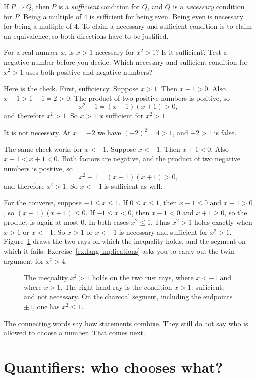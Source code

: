 If $P\Rightarrow Q$, then $P$ is a \emph{sufficient} condition for $Q$, and $Q$ is a \emph{necessary} condition for $P$. Being a multiple of $4$ is sufficient for being even. Being even is necessary for being a multiple of $4$. To claim a necessary and sufficient condition is to claim an equivalence, so both directions have to be justified.

\begin{think}
For a real number $x$, is $x>1$ necessary for $x^2>1$? Is it sufficient?
Test a negative number before you decide. Which necessary and sufficient condition for $x^2>1$ uses both positive and negative numbers?
\end{think}

Here is the check. First, sufficiency. Suppose $x>1$. Then $x-1>0$. Also $x+1>1+1=2>0$. The product of two positive numbers is positive, so
\[
x^2-1=(x-1)(x+1)>0,
\]
and therefore $x^2>1$. So $x>1$ is sufficient for $x^2>1$.

It is not necessary. At $x=-2$ we have $(-2)^2=4>1$, and $-2>1$ is false.

The same check works for $x<-1$. Suppose $x<-1$. Then $x+1<0$. Also $x-1<x+1<0$. Both factors are negative, and the product of two negative numbers is positive, so
\[
x^2-1=(x-1)(x+1)>0,
\]
and therefore $x^2>1$. So $x<-1$ is sufficient as well.

For the converse, suppose $-1\le x\le 1$. If $0\le x\le 1$, then $x-1\le 0$ and $x+1>0$, so $(x-1)(x+1)\le 0$. If $-1\le x<0$, then $x-1<0$ and $x+1\ge 0$, so the product is again at most $0$. In both cases $x^2\le 1$. Thus $x^2>1$ holds exactly when $x>1$ or $x<-1$. So $x>1$ or $x<-1$ is necessary and sufficient for $x^2>1$. Figure~\ref{fig:lang-rays} draws the two rays on which the inequality holds, and the segment on which it fails. Exercise~\ref{ex:lang-implications} asks you to carry out the twin argument for $x^2>4$.

\begin{figure}[ht]
\centering
{}
\caption{The inequality $x^2>1$ holds on the two rust rays, where $x<-1$ and where $x>1$. The right-hand ray is the condition $x>1$: sufficient, and not necessary. On the charcoal segment, including the endpoints $\pm 1$, one has $x^2\le 1$.}
\label{fig:lang-rays}
\end{figure}

The connecting words say how statements combine. They still do not say who is allowed to choose a number. That comes next.

\section{Quantifiers: who chooses what?}\label{sec:quantifiers}

